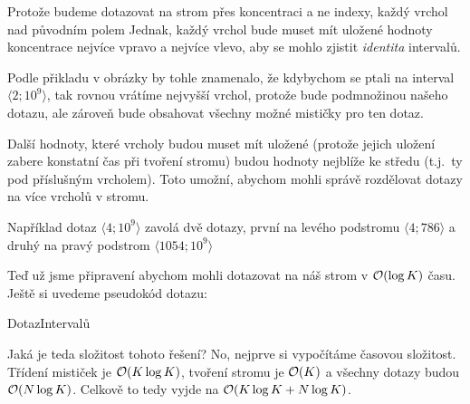 \documentclass{../../../ksp}
\begin{document}
Protože budeme dotazovat na strom přes koncentraci a ne indexy, každý vrchol nad původním polem
Jednak, každý vrchol bude muset mít uložené hodnoty koncentrace nejvíce vpravo a nejvíce vlevo,
aby se mohlo zjistit \emph{identita} intervalů.

Podle přikladu v obrázky by tohle znamenalo, že kdybychom se ptali na interval $\langle 2; 10^9 \rangle$,
tak rovnou vrátíme nejvyšší vrchol, protože bude podmnožinou našeho dotazu, ale zároveň bude obsahovat všechny
možné mističky pro ten dotaz.

Další hodnoty, které vrcholy budou muset mít uložené (protože jejich uložení zabere konstatní čas při tvoření stromu)
budou hodnoty nejblíže ke středu (t.j.\ ty pod příslušným vrcholem).
Toto umožní, abychom mohli správě rozdělovat dotazy na více vrcholů v stromu.

Například dotaz $\langle 4; 10^9 \rangle$ zavolá dvě dotazy, první na levého podstromu $\langle 4; 786 \rangle$
a druhý na pravý podstrom $\langle 1054; 10^9 \rangle$

Teď už jsme připravení abychom mohli dotazovat na náš strom v $\mathcal{O}(\log{K})$ času.
Ještě si uvedeme pseudokód dotazu:

\begin{algorithm*}
    \caption{DotazIntervalů}
    \begin{algorithmic}
        \EndIf{}
        \Else{}
        \EndIf{}
    \end{algorithmic}
\end{algorithm*}

Jaká je teda složitost tohoto řešení?
No, nejprve si vypočítáme časovou složitost.
Třídení mističek je $\mathcal{O}(K\log{K})$, tvoření stromu je $\mathcal{O}(K)$ a všechny dotazy budou
$\mathcal{O}(N\log{K})$. Celkově to tedy vyjde na $\mathcal{O}(K\log{K} + N\log{K})$.
\end{document}
